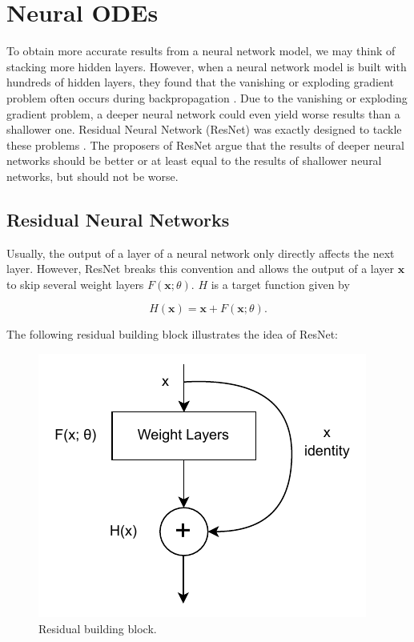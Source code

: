 \documentclass[
	parskip, 			   %
	twoside, 			   %
	DIV=14, 			   %
	BCOR=15.0mm, 		   %
	headsepline, 		   %
	open=right, 		   %
	captions=tableheading, %
	bibliography=totoc,    %
	numbers=noenddot       %
]{scrreprt}
\begin{document}
\clearpage
\chapter{Neural ODEs}
\label{ch:chapter5}
To obtain more accurate results from a neural network model, we may think of stacking more hidden layers. However, when a neural network model is built with hundreds of hidden layers, they found that the vanishing or exploding gradient problem often occurs during backpropagation \cite{glorot2010understanding}. Due to the vanishing or exploding gradient problem, a deeper neural network could even yield worse results than a shallower one. Residual Neural Network (ResNet) was exactly designed to tackle these problems \cite{he2016deep}. The proposers of ResNet argue that the results of deeper neural networks should be better or at least equal to the results of shallower neural networks, but should not be worse.

\section{Residual Neural Networks}
Usually, the output of a layer of a neural network only directly affects the next layer. However, ResNet breaks this convention and allows the output of a layer $\mathbf{x}$ to skip several weight layers $F(\mathbf{x};\theta)$. $H$ is a target function given by

\begin{equation}
    \label{eq:ResNet}
    H(\mathbf{x})=\mathbf{x}+F(\mathbf{x};\theta).
\end{equation}

The following residual building block illustrates the idea of ResNet:

\clearpage
\begin{figure}[htbp!]
    \centering
    \includegraphics[scale=1]{figures/ResNet.pdf}
    \caption{Residual building block.}
    \label{fig:ResNet}
\end{figure}
\end{document}
